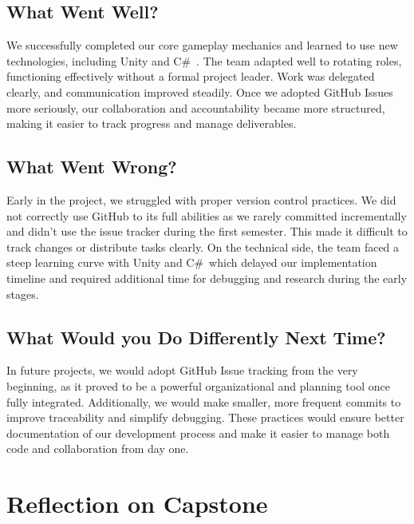 \documentclass{article}
\begin{document}
\subsection{What Went Well?}

We successfully completed our core gameplay mechanics and learned to use new technologies, including Unity and C\#\ . The team adapted well to rotating roles, functioning effectively without a formal project leader. Work was delegated clearly, and communication improved steadily. Once we adopted GitHub Issues more seriously, our collaboration and accountability became more structured, making it easier to track progress and manage deliverables.

\subsection{What Went Wrong?}

Early in the project, we struggled with proper version control practices. We did not correctly use GitHub to its full abilities as we rarely committed incrementally and didn’t use the issue tracker during the first semester. This made it difficult to track changes or distribute tasks clearly. On the technical side, the team faced a steep learning curve with Unity and C\#\, which delayed our implementation timeline and required additional time for debugging and research during the early stages.

\subsection{What Would you Do Differently Next Time?}

In future projects, we would adopt GitHub Issue tracking from the very beginning, as it proved to be a powerful organizational and planning tool once fully integrated. Additionally, we would make smaller, more frequent commits to improve traceability and simplify debugging. These practices would ensure better documentation of our development process and make it easier to manage both code and collaboration from day one.

\section{Reflection on Capstone}
\end{document}
